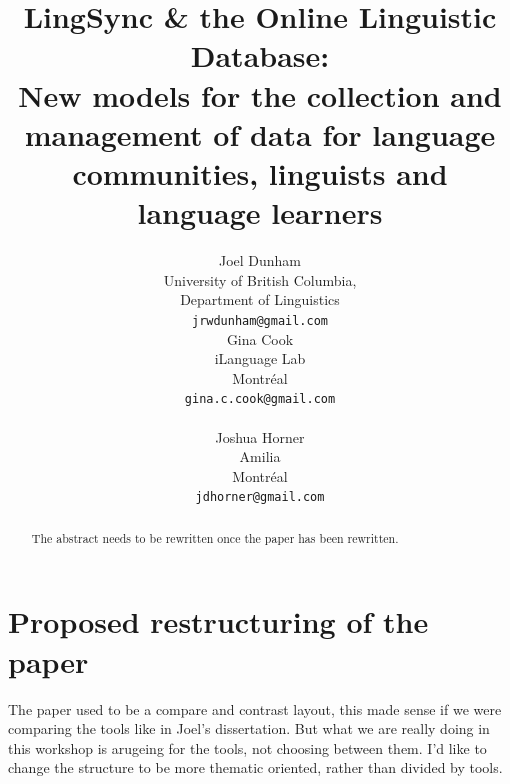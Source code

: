 \documentclass[11pt]{article}
\title{LingSync \& the Online Linguistic Database:\\New models for the
    collection and management of data for language communities, linguists and
language learners}
\author{Joel Dunham \\
University of British Columbia,   \\
Department of Linguistics \\
{\tt jrwdunham@gmail.com} \\\And
Gina Cook \\
iLanguage Lab \\
Montr\'eal \\
{\tt gina.c.cook@gmail.com} \\  \\\And
Joshua Horner \\
Amilia  \\
Montr\'eal \\
{\tt jdhorner@gmail.com} \\ }
\date{}
\begin{document}
\maketitle


\begin{abstract}
The abstract needs to be rewritten once the paper has been rewritten.
\end{abstract}

\section*{Proposed restructuring of the paper}

The paper used to be a compare and contrast layout, this made sense if we were comparing the tools like in Joel's dissertation. But what we are really doing in this workshop is arugeing for the tools, not choosing between them. I'd like to change the structure to be more thematic oriented, rather than divided by tools.
\end{document}
